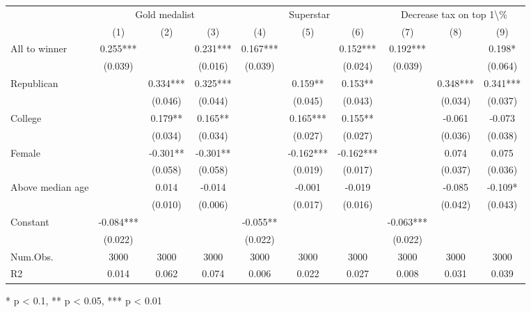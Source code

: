 \begin{table}[t]
\fontsize{12.0pt}{14.4pt}\selectfont
\begin{tabular*}{\linewidth}{@{\extracolsep{\fill}}lccccccccc}
\toprule
 & \multicolumn{3}{c}{Gold medalist} & \multicolumn{3}{c}{Superstar} & \multicolumn{3}{c}{Decrease tax on top 1\textbackslash{}\%} \\ 
\cmidrule(lr){2-4} \cmidrule(lr){5-7} \cmidrule(lr){8-10}
  & (1) & (2) & (3) & (4) & (5) & (6) & (7) & (8) & (9) \\ 
\midrule\addlinespace[2.5pt]
All to winner & 0.255*** &  & 0.231*** & 0.167*** &  & 0.152*** & 0.192*** &  & 0.198* \\ 
 & (0.039) &  & (0.016) & (0.039) &  & (0.024) & (0.039) &  & (0.064) \\ 
Republican &  & 0.334*** & 0.325*** &  & 0.159** & 0.153** &  & 0.348*** & 0.341*** \\ 
 &  & (0.046) & (0.044) &  & (0.045) & (0.043) &  & (0.034) & (0.037) \\ 
College &  & 0.179** & 0.165** &  & 0.165*** & 0.155** &  & -0.061 & -0.073 \\ 
 &  & (0.034) & (0.034) &  & (0.027) & (0.027) &  & (0.036) & (0.038) \\ 
Female &  & -0.301** & -0.301** &  & -0.162*** & -0.162*** &  & 0.074 & 0.075 \\ 
 &  & (0.058) & (0.058) &  & (0.019) & (0.017) &  & (0.037) & (0.036) \\ 
Above median age &  & 0.014 & -0.014 &  & -0.001 & -0.019 &  & -0.085 & -0.109* \\ 
 &  & (0.010) & (0.006) &  & (0.017) & (0.016) &  & (0.042) & (0.043) \\ 
Constant & -0.084*** &  &  & -0.055** &  &  & -0.063*** &  &  \\ 
{} & {(0.022)} & {} & {} & {(0.022)} & {} & {} & {(0.022)} & {} & {} \\ 
Num.Obs. & 3000 & 3000 & 3000 & 3000 & 3000 & 3000 & 3000 & 3000 & 3000 \\ 
R2 & 0.014 & 0.062 & 0.074 & 0.006 & 0.022 & 0.027 & 0.008 & 0.031 & 0.039 \\ 
\bottomrule
\end{tabular*}
\begin{minipage}{\linewidth}
* p < 0.1, ** p < 0.05, *** p < 0.01\\
\end{minipage}
\end{table}


